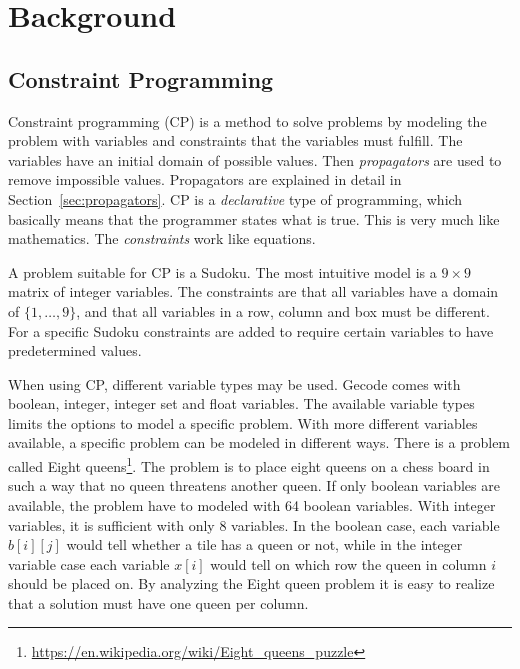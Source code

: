 \documentclass[a4paper,11pt]{article}
\begin{document}
\section{Background}
\subsection{Constraint Programming}

Constraint programming (CP) is a method to solve problems by modeling the problem with variables and constraints that the variables must fulfill. The variables have an initial domain of possible values. Then \textit{propagators} are used to remove impossible values. Propagators are explained in detail in Section~\ref{sec:propagators}. CP is a \textit{declarative} type of programming, which basically means that the programmer states what is true. This is very much like mathematics. The \textit{constraints} work like equations.

A problem suitable for CP is a Sudoku. The most intuitive model is a $9\times9$ matrix of integer variables. The constraints are that all variables have a domain of $\{1,\ldots,9\}$, and that all variables in a row, column and box must be different. For a specific Sudoku constraints are added to require certain variables to have predetermined values.

When using CP, different variable types may be used. Gecode comes with boolean, integer, integer set and float variables. The available variable types limits the options to model a specific problem. With more different variables available, a specific problem can be modeled in different ways. There is a problem called Eight queens\footnote{\url{https://en.wikipedia.org/wiki/Eight_queens_puzzle}}. The problem is to place eight queens on a chess board in such a way that no queen threatens another queen. If only boolean variables are available, the problem have to modeled with 64 boolean variables. With integer variables, it is sufficient with only 8 variables. In the boolean case, each variable $b[i][j]$ would tell whether a tile has a queen or not, while in the integer variable case each variable $x[i]$ would tell on which row the queen in column $i$ should be placed on. By analyzing the Eight queen problem it is easy to realize that a solution must have one queen per column.
\end{document}
